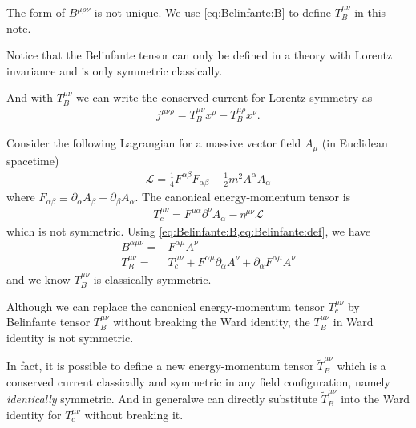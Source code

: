 \documentclass[10pt]{article}
\begin{document}
\begin{remark}
    The form of $B^{\mu\rho\nu}$ is not unique.
    We use \cref{eq:Belinfante:B} to define $T_B^{\mu\nu}$ in this note.
    
    Notice that the Belinfante tensor can only be defined in a theory with Lorentz invariance and is only symmetric classically.
    
    And with $T^{\mu\nu}_B$ we can write the conserved current for Lorentz symmetry as\snm
    \begin{align}
        j^{\mu\nu\rho}=T^{\mu\nu}_B x^\rho-T^{\mu\rho}_B x^\nu.\label{eq:Belinfante:after_stress_tensor}
    \end{align}
\end{remark}
\begin{example}
    Consider the following Lagrangian for a massive vector field $A_\mu$ (in Euclidean spacetime)
    \begin{align}
        \mathcal{L}=\frac{1}{4}F^{\alpha\beta}F_{\alpha\beta}+\frac{1}{2}m^2 A^\alpha A_\alpha
    \end{align}
    where $F_{\alpha\beta}\equiv\partial_\alpha A_\beta-\partial_\beta A_\alpha$.
    The canonical energy-momentum tensor is
    \begin{align}
        T^{\mu\nu}_c=F^{\mu\alpha}\partial^\nu A_\alpha-\eta^{\mu\nu}\mathcal{L}
    \end{align}
    which is not symmetric.
    Using \cref{eq:Belinfante:B,eq:Belinfante:def}, we have
    \begin{align}
        B^{\alpha\mu\nu}= & F^{\alpha\mu}A^\nu                                                                 \\
        T^{\mu\nu}_B=     & T^{\mu\nu}_c+F^{\alpha\mu}\partial_\alpha A^\nu+\partial_\alpha F^{\alpha\mu}A^\nu
    \end{align}
    and we know $T^{\mu\nu}_B$ is classically symmetric.
\end{example}
\begin{intu}
    Although we can replace the canonical energy-momentum tensor $T^{\mu\nu}_c$ by Belinfante tensor $T^{\mu\nu}_B$ without breaking the Ward identity, the $T^{\mu\nu}_B$ in Ward identity is not symmetric\snm.
    
    In fact, it is possible to define a new energy-momentum tensor $\tilde{T}^{\mu\nu}_B$ which is a conserved current classically and symmetric in any field configuration, namely \textit{identically} symmetric.
    And in general\snm we can directly substitute $\tilde{T}^{\mu\nu}_B$ into the Ward identity for $T^{\mu\nu}_c$ without breaking it.
\end{intu}
\end{document}
